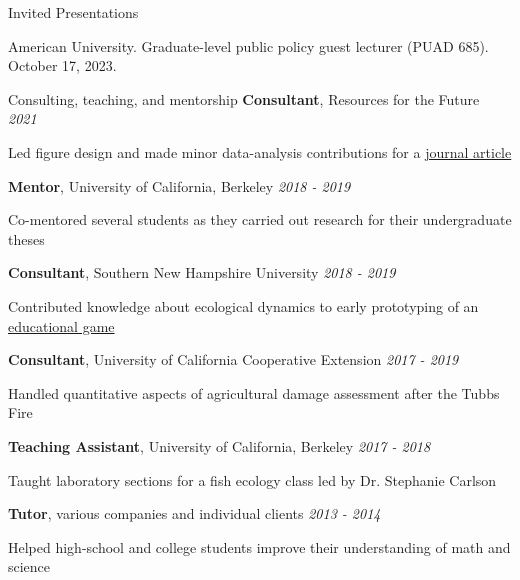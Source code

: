 \documentclass{resume} %
\begin{document}
\begin{rSection}{Invited Presentations}

{American University. Graduate-level public policy guest lecturer (PUAD 685). October 17, 2023.}

\end{rSection}

\begin{rSection}{Consulting, teaching, and mentorship}
{\bf Consultant}{, Resources for the Future} \hfill {\em 2021}
\vspace{-7pt}
\begin{adjustwidth}{12pt}{}
{\small Led figure design and made minor data-analysis contributions for a \href{https://www.brookings.edu/articles/the-social-cost-of-carbon/}{journal article}}
\end{adjustwidth}
{\bf Mentor}{, University of California, Berkeley} \hfill {\em 2018 - 2019}
\vspace{-7pt}
\begin{adjustwidth}{12pt}{}
{\small Co-mentored several students as they carried out research for their undergraduate theses}
\end{adjustwidth}
{\bf Consultant}{, Southern New Hampshire University} \hfill {\em 2018 - 2019}
\vspace{-7pt}
\begin{adjustwidth}{12pt}{}
{\small Contributed knowledge about ecological dynamics to early prototyping of an \href{https://vimeo.com/417368718}{educational game}}
\end{adjustwidth}
{\bf Consultant}{, University of California Cooperative Extension} \hfill {\em 2017 - 2019}
\vspace{-7pt}
\begin{adjustwidth}{12pt}{}
{\small Handled quantitative aspects of agricultural damage assessment after the Tubbs Fire}
\end{adjustwidth}
{\bf Teaching Assistant}{, University of California, Berkeley} \hfill {\em 2017 - 2018}
\vspace{-7pt}
\begin{adjustwidth}{12pt}{}
{\small Taught laboratory sections for a fish ecology class led by Dr. Stephanie Carlson}
\end{adjustwidth}
{\bf Tutor}{, various companies and individual clients} \hfill {\em 2013 - 2014}
\vspace{-7pt}
\begin{adjustwidth}{12pt}{}
{\small Helped high-school and college students improve their understanding of math and science}
\end{adjustwidth}
\end{rSection}
\end{document}
